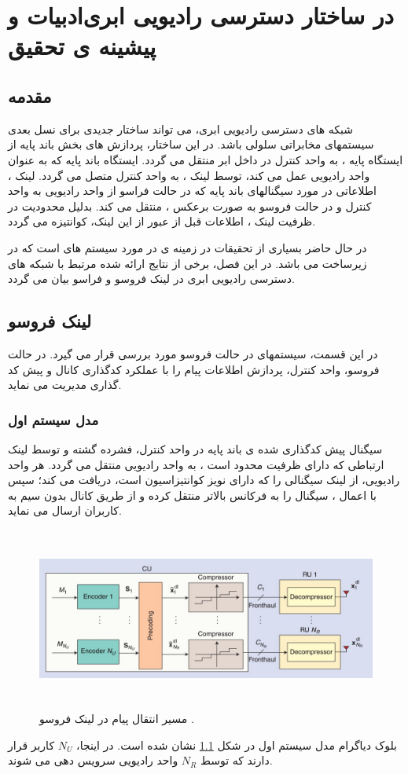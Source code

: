  \chapter{ در ساختار دسترسی رادیویی ابری‌ادبیات و پیشینه ی تحقیق}
 \section{مقدمه}
 شبکه های دسترسی رادیویی ابری، می تواند ساختار جدیدی برای نسل بعدی سیستمهای مخابراتی سلولی باشد. در این ساختار، پردازش های بخش باند پایه از ایستگاه پایه ، به واحد کنترل  در داخل ابر  منتقل می گردد. ایستگاه باند پایه که به عنوان واحد رادیویی  عمل می کند، توسط لینک ، به واحد کنترل متصل می گردد. لینک ، اطلاعاتی در مورد سیگنالهای باند پایه که در حالت فراسو از واحد رادیویی به واحد کنترل و در حالت فروسو به صورت برعکس ، منتقل می کند. بدلیل محدودیت در ظرفیت لینک ،\cite{fc} اطلاعات قبل از عبور از این لینک، کوانتیزه می گردد.
 
 
در حال حاضر بسیاری از تحقیقات در زمینه ی  در مورد سیستم های  است که در زیرساخت  می باشد.
در این فصل، برخی از نتایج ارائه شده مرتبط با شبکه های دسترسی رادیویی ابری در لینک فروسو و  فراسو بیان می گردد.
\section{لینک فروسو}
در این قسمت، سیستمهای   در حالت فروسو مورد بررسی قرار می گیرد. در حالت فروسو،  واحد کنترل، پردازش اطلاعات پیام را با عملکرد کدگذاری کانال و پیش کد گذاری  مدیریت می نماید.
\subsection{مدل سیستم اول}
سیگنال پیش کدگذاری شده ی باند پایه در واحد کنترل، فشرده گشته و توسط لینک ارتباطی  که دارای ظرفیت محدود است \cite{fc2}، به واحد رادیویی منتقل می گردد.
هر واحد رادیویی، از لینک  سیگنالی را که دارای نویز کوانتیزاسیون است، دریافت می کند؛ سپس با اعمال ، سیگنال را به فرکانس بالاتر منتقل کرده و از طریق کانال بدون سیم به کاربران ارسال می نماید.
\begin{figure}[H]
  \centering
    \includegraphics[width=\linewidth, height=6cm]{dl}
  \caption{مسیر انتقال پیام در لینک فروسو \cite{Fronthaul}.}
  \label{fig:dl}
\end{figure}
بلوک دیاگرام مدل سیستم اول
در شکل \ref{fig:dl} نشان شده است. 
در اینجا، $N_U$ کاربر قرار دارند که توسط $N_R$ واحد رادیویی سرویس دهی می شوند.


